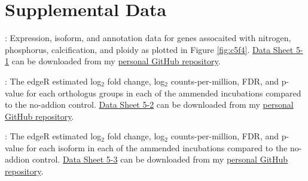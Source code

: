 \begin{landscape}
\begin{table}[h!]
\begin{tabular}{lL{1.25cm}L{2cm}L{2.5cm}L{2cm}L{2cm}L{2cm}L{3cm}L{3cm}}
\end{tabular}
\end{table}
\end{landscape}

\section{Supplemental Data}

    \begin{DS5}
\item \label{DS51}: Expression, isoform, and annotation data for genes assocaited with nitrogen, phosphorus, calcification, and ploidy as plotted in Figure \ref{fig:c5f4}. \href{https://github.com/halexand/MIT\_Latex/blob/master/SupplementalDataSheet\_Chapter5/C5\_DataSheet1\_NutrientGenes.xlsx?raw=true}{Data Sheet 5-1} can be downloaded from my \href{https://github.com/halexand/MIT\_Latex/tree/master/SupplementalDataSheet\_Chapter5}{personal GitHub repository}. 
  
    \item \label{DS52}: The edgeR estimated log$_2$ fold change, log$_2$ counts-per-million, FDR, and p-value for each orthologus groups in each of the ammended incubations compared to the no-addion control.  \href{https://github.com/halexand/MIT\_Latex/blob/master/SupplementalDataSheet\_Chapter5/C5\_DataSheet2\_AllGenes.xlsx?raw=true}{Data Sheet 5-2} can be downloaded from my \href{https://github.com/halexand/MIT\_Latex/tree/master/SupplementalDataSheet\_Chapter5}{personal GitHub repository}. 

    \item \label{DS53}: The edgeR estimated log$_2$ fold change, log$_2$ counts-per-million, FDR, and p-value for each isoform in each of the ammended incubations compared to the no-addion control. \href{https://github.com/halexand/MIT\_Latex/blob/master/SupplementalDataSheet\_Chapter5/C5\_DataSheet3\_AllIsoforms.xlsx?raw=true}{Data Sheet 5-3} can be downloaded from my \href{https://github.com/halexand/MIT\_Latex/tree/master/SupplementalDataSheet\_Chapter5}{personal GitHub repository}. 
  
    \end{DS5}




